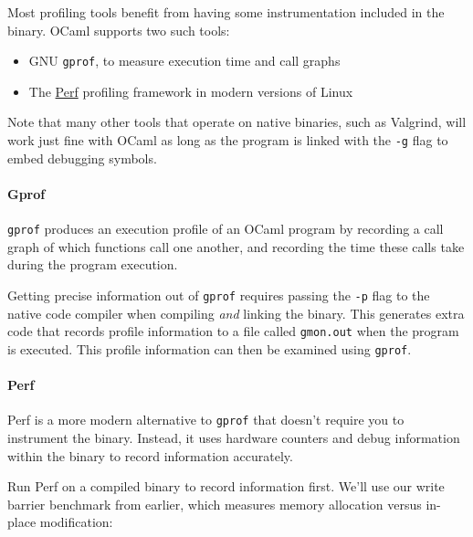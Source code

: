 Most profiling tools benefit from having some instrumentation included
in the binary. OCaml supports two such tools:

\begin{itemize}
\item
  GNU \passthrough{\lstinline!gprof!}, to measure execution time and
  call graphs
\item
  The \href{https://perf.wiki.kernel.org/}{Perf} profiling framework in
  modern versions of Linux
\end{itemize}

Note that many other tools that operate on native binaries, such as
Valgrind, will work just fine with OCaml as long as the program is
linked with the \passthrough{\lstinline!-g!} flag to embed debugging
symbols.

\hypertarget{gprof}{%
\paragraph{Gprof}\label{gprof}}

\passthrough{\lstinline!gprof!} produces an execution profile of an
OCaml program by recording a call graph of which functions call one
another, and recording the time these calls take during the program
execution.

Getting precise information out of \passthrough{\lstinline!gprof!}
requires passing the \passthrough{\lstinline!-p!} flag to the native
code compiler when compiling \emph{and} linking the binary. This
generates extra code that records profile information to a file called
\passthrough{\lstinline!gmon.out!} when the program is executed. This
profile information can then be examined using
\passthrough{\lstinline!gprof!}.

\hypertarget{perf}{%
\paragraph{Perf}\label{perf}}

Perf is a more modern alternative to \passthrough{\lstinline!gprof!}
that doesn't require you to instrument the binary. Instead, it uses
hardware counters and debug information within the binary to record
information accurately.

Run Perf on a compiled binary to record information first. We'll use our
write barrier benchmark from earlier, which measures memory allocation
versus in-place modification:

